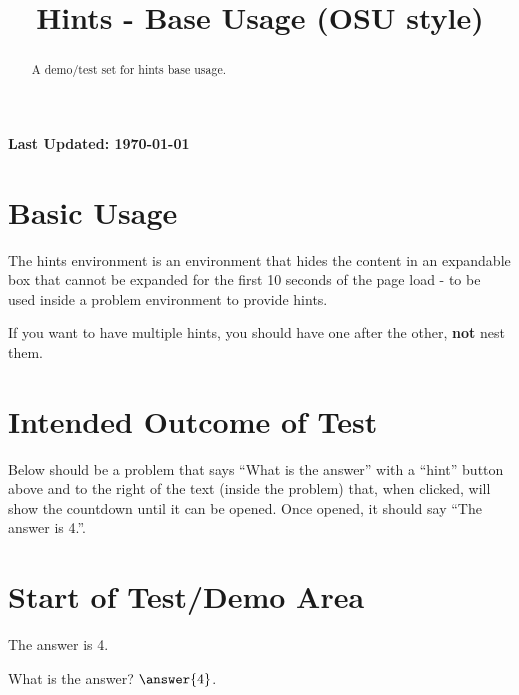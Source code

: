 \documentclass{ximera}
\title{Hints - Base Usage (OSU style)}
\begin{document}
\begin{abstract}
    A demo/test set for hints base usage.
\end{abstract}
\maketitle

{{\Huge \bfseries Last Updated: \today}} \\

\section{Basic Usage}
The hints environment is an environment that hides the content in an expandable box that cannot be expanded for
the first 10 seconds of the page load - to be used inside a problem environment to provide hints.

If you want to have multiple hints, you should have one after the other, \textbf{not} nest them.

\section{Intended Outcome of Test}

Below should be a problem that says ``What is the answer'' with a ``hint'' button above and to the right of the text (inside the problem)
that, when clicked, will show the countdown until it can be opened. Once opened, it should say ``The answer is 4.''.

\section{Start of Test/Demo Area}

\begin{problem}
    \begin{hint}
        The answer is 4.
    \end{hint}
    What is the answer? $\answer{4}$.
\end{problem}

\hrulefill
\end{document}
